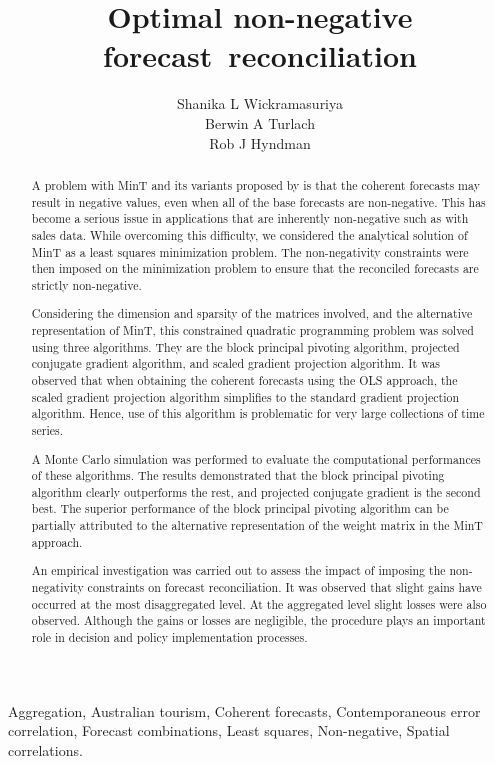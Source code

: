 \documentclass[11pt]{article}
\title{Optimal non-negative forecast~reconciliation}
\author{Shanika L Wickramasuriya\\ Berwin A Turlach\\ Rob J Hyndman}
\newcommand{\0}{\phantom{0}}
\begin{document}
\titlepage

\begin{abstract}
A problem with MinT and its variants proposed by \citet{Wick2018} is that the coherent forecasts may result in negative values, even when all of the base forecasts are non-negative. This has become a serious issue in applications that are inherently non-negative such as with sales data. While overcoming this difficulty, we considered the analytical solution of MinT as a least squares minimization problem. The non-negativity constraints were then imposed on the minimization problem to ensure that the reconciled forecasts are strictly non-negative.
 
Considering the dimension and sparsity of the matrices involved, and the alternative representation of MinT, this constrained quadratic programming problem was solved using three algorithms. They are the block principal pivoting algorithm, projected conjugate gradient algorithm, and scaled gradient projection algorithm. It was observed that when obtaining the coherent forecasts using the OLS approach, the scaled gradient projection algorithm simplifies to the standard gradient projection algorithm. Hence, use of this algorithm is problematic for very large collections of time series. 

A Monte Carlo simulation was performed to evaluate the computational performances of these algorithms. The results demonstrated that the block principal pivoting algorithm clearly outperforms the rest, and projected conjugate gradient is the second best. The superior performance of the block principal pivoting algorithm can be partially attributed to the alternative representation of the weight matrix in the MinT approach.
 
An empirical investigation was carried out to assess the impact of imposing the non-negativity constraints on forecast reconciliation. It was observed that slight gains have occurred at the most disaggregated level. At the aggregated level slight losses were also observed. Although the gains or losses are negligible, the procedure plays an important role in decision and policy implementation processes.


\end{abstract}

\begin{keywords}
	Aggregation, Australian tourism, Coherent forecasts, Contemporaneous error correlation, Forecast combinations, Least squares, Non-negative, Spatial correlations.
\end{keywords}
\end{document}
